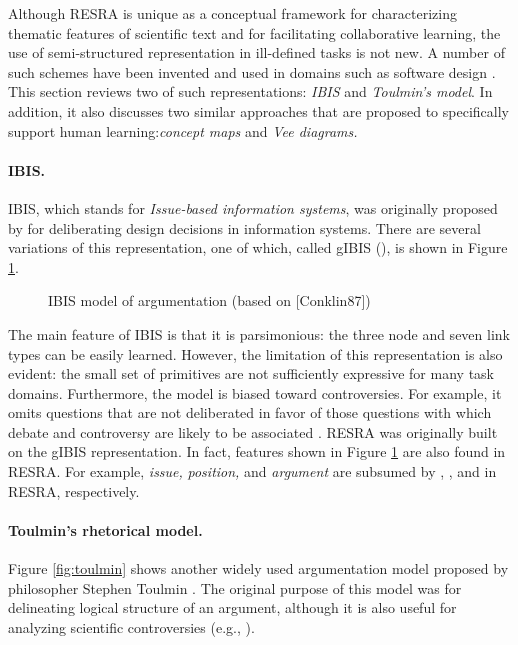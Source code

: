 Although RESRA is unique as a conceptual framework for characterizing
thematic features of scientific text and for facilitating collaborative
learning, the use of semi-structured representation in ill-defined tasks is
not new. A number of such schemes have been invented and used in domains
such as software design \cite{Lee91What}. This section reviews two of such
representations: {\it IBIS\/} and {\it Toulmin's model\/}. In addition, it
also discusses two similar approaches that are proposed to specifically
support human learning:{\it concept maps\/} and {\it Vee diagrams.\/}


\paragraph{IBIS.}

IBIS, which stands for {\it Issue-based information systems\/}, was
originally proposed by \cite{Kunz70} for deliberating design decisions in
information systems.  There are several variations of this representation,
one of which, called gIBIS (\cite{Conklin88}), is shown in Figure
\ref{fig:ibis}.

\begin{figure}[htbp]
 \caption{IBIS model of argumentation (based on [Conklin87])}
  \label{fig:ibis}
\end{figure}

The main feature of IBIS is that it is parsimonious: the three node and
seven link types can be easily learned. However, the limitation of this
representation is also evident: the small set of primitives are not
sufficiently expressive for many task domains.  Furthermore, the model is
biased toward controversies. For example, it omits questions that are not
deliberated in favor of those questions with which debate and controversy
are likely to be associated \cite{MacLean91Questions}.  RESRA was
originally built on the gIBIS representation. In fact, features
shown in Figure \ref{fig:ibis} are also found in RESRA.  For example, {\it
issue,\/} {\it position,\/} and {\it argument\/} are subsumed by
, , and  in RESRA,
respectively.


\paragraph{Toulmin's rhetorical model.}

Figure \ref{fig:toulmin} shows another widely used argumentation model
proposed by philosopher Stephen Toulmin \cite{Toulmin58}. The original
purpose of this model was for delineating logical structure of an argument,
although it is also useful for analyzing scientific controversies (e.g.,
\cite{Cavalli-Sforza92}).

